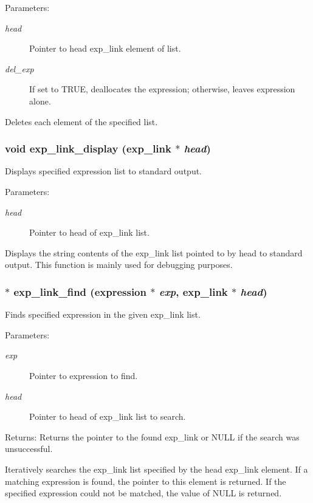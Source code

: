 \begin{Desc}
\item[Parameters:]
\begin{description}
\item[{\em head}]Pointer to head exp\_\-link element of list. \item[{\em del\_\-exp}]If set to TRUE, deallocates the expression; otherwise, leaves expression alone.\end{description}
\end{Desc}
Deletes each element of the specified list. 
\subsubsection{\setlength{\rightskip}{0pt plus 5cm}void exp\_\-link\_\-display ({\bf exp\_\-link} $\ast$ {\em head})}\label{link_8h_a8}


Displays specified expression list to standard output. 

\begin{Desc}
\item[Parameters:]
\begin{description}
\item[{\em head}]Pointer to head of exp\_\-link list.\end{description}
\end{Desc}
Displays the string contents of the exp\_\-link list pointed to by head to standard output. This function is mainly used for debugging purposes. 
\subsubsection{$\ast$ exp\_\-link\_\-find ({\bf expression} $\ast$ {\em exp}, {\bf exp\_\-link} $\ast$ {\em head})}\label{link_8h_a13}


Finds specified expression in the given exp\_\-link list. 

\begin{Desc}
\item[Parameters:]
\begin{description}
\item[{\em exp}]Pointer to expression to find. \item[{\em head}]Pointer to head of exp\_\-link list to search.\end{description}
\end{Desc}
\begin{Desc}
\item[Returns:]Returns the pointer to the found exp\_\-link or NULL if the search was unsuccessful.\end{Desc}
Iteratively searches the exp\_\-link list specified by the head exp\_\-link element. If a matching expression is found, the pointer to this element is returned. If the specified expression could not be matched, the value of NULL is returned. 
